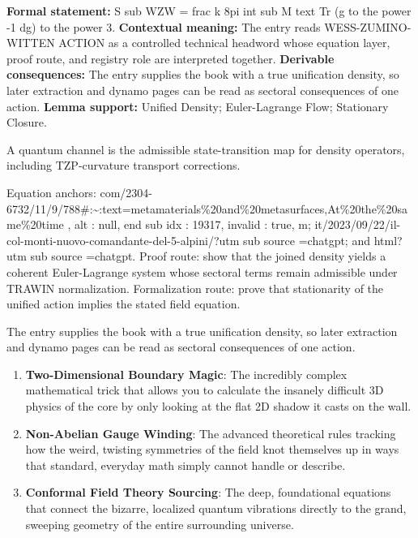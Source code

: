 \begingroup\footnotesize\setlength{\emergencystretch}{3em}\sloppy
\textbf{Formal statement:} S sub WZW = frac k 8pi int sub M text Tr (g to the power -1 dg) to the power 3. \textbf{Contextual meaning:} The entry reads WESS-ZUMINO-WITTEN ACTION as a controlled technical headword whose equation layer, proof route, and registry role are interpreted together. \textbf{Derivable consequences:} The entry supplies the book with a true unification density, so later extraction and dynamo pages can be read as sectoral consequences of one action. \textbf{Lemma support:} Unified Density; Euler-Lagrange Flow; Stationary Closure.\par
\endgroup

A quantum channel is the admissible state-transition map for density operators, including TZP-curvature transport corrections.

Equation anchors: com/2304-6732/11/9/788\#:\textasciitilde{}:text=metamaterials\%20and\%20metasurfaces,At\%20the\%20same\%20time , alt : null, end sub idx : 19317, invalid : true, m; it/2023/09/22/il-col-monti-nuovo-comandante-del-5-alpini/?utm sub source =chatgpt; and html?utm sub source =chatgpt. Proof route: show that the joined density yields a coherent Euler-Lagrange system whose sectoral terms remain admissible under TRAWIN normalization. Formalization route: prove that stationarity of the unified action implies the stated field equation.

The entry supplies the book with a true unification density, so later extraction and dynamo pages can be read as sectoral consequences of one action.
\endgroup

\begin{enumerate}[leftmargin=1.6em,itemsep=6pt,topsep=4pt]
\item \textbf{Two-Dimensional Boundary Magic}: The incredibly complex mathematical trick that allows you to calculate the insanely difficult 3D physics of the core by only looking at the flat 2D shadow it casts on the wall.
\item \textbf{Non-Abelian Gauge Winding}: The advanced theoretical rules tracking how the weird, twisting symmetries of the field knot themselves up in ways that standard, everyday math simply cannot handle or describe.
\item \textbf{Conformal Field Theory Sourcing}: The deep, foundational equations that connect the bizarre, localized quantum vibrations directly to the grand, sweeping geometry of the entire surrounding universe.
\end{enumerate}

